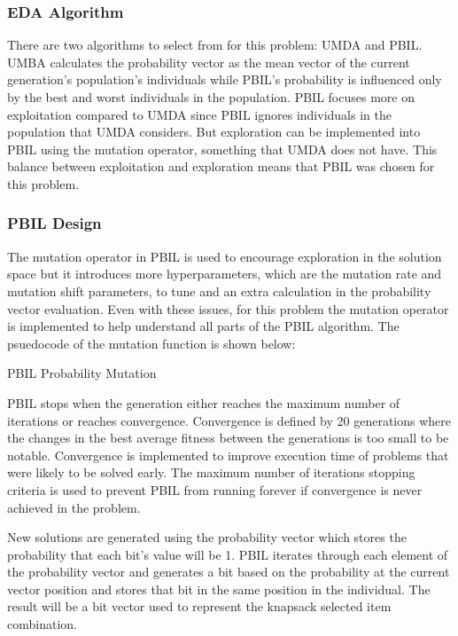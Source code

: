\documentclass{article}
\begin{document}
\subsubsection*{EDA Algorithm}
There are two algorithms to select from for this problem: UMDA and PBIL. UMBA calculates the probability vector as the mean vector of the current generation’s population’s individuals while PBIL's probability is influenced only by the best and worst individuals in the population. PBIL focuses more on exploitation compared to UMDA since PBIL ignores individuals in the population that UMDA considers. But exploration can be implemented into PBIL using the mutation operator, something that UMDA does not have. This balance between exploitation and exploration means that PBIL was chosen for this problem. \par
\subsubsection*{PBIL Design}
The mutation operator in PBIL is used to encourage exploration in the solution space but it introduces more hyperparameters, which are the mutation rate and mutation shift parameters, to tune and an extra calculation in the probability vector evaluation. Even with these issues, for this problem the mutation operator is implemented to help understand all parts of the PBIL algorithm. The psuedocode of the mutation function is shown below: \par
\begin{algorithm}
	\caption{PBIL Probability Mutation}
	\begin{algorithmic}
			\EndIf
		\EndFor
	\end{algorithmic}
\end{algorithm}
\noindent PBIL stops when the generation either reaches the maximum number of iterations or reaches convergence. Convergence is defined by 20 generations where the changes in the best average fitness between the generations is too small to be notable. Convergence is implemented to improve execution time of problems that were likely to be solved early. The maximum number of iterations stopping criteria is used to prevent PBIL from running forever if convergence is never achieved in the problem. \par
\noindent New solutions are generated using the probability vector which stores the probability that each bit’s value will be 1.  PBIL iterates through each element of the probability vector and generates a bit based on the probability at the current vector position and stores that bit in the same position in the individual. The result will be a bit vector used to represent the knapsack selected item combination. \par
\end{document}
